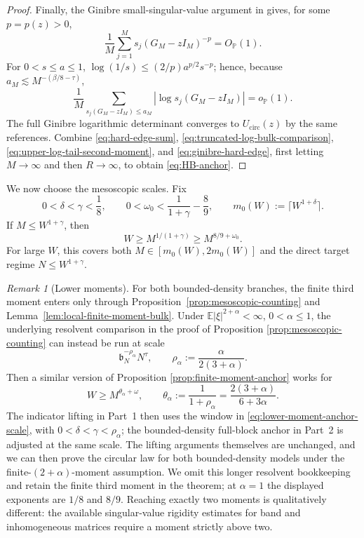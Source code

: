 \documentclass[11pt,reqno]{amsart}
\numberwithin{equation}{section}
\theoremstyle{definition}
\theoremstyle{remark}
\newtheorem{remark}[theorem]{Remark}
\newcommand{\E}{\mathbb E}
\newcommand{\Pp}{\mathbb P}
\newcommand{\1}{\mathbf 1}
\newcommand{\cir}{\mathrm{circ}}
\begin{document}
\begin{proof}
Finally, the Ginibre small-singular-value argument in
\cite[(4.9), Corollary~4.10, and Lemmas~4.11--4.12]
{BordenaveChafai2012}
gives, for some $p=p(z)>0$,
\[
 \frac1M\sum_{j=1}^M s_j(G_M-zI_M)^{-p}=O_{\Pp}(1).
\]
For $0<s\le a\le1$,
$\log(1/s)\le(2/p)a^{p/2}s^{-p}$; hence, because
$a_M\lesssim M^{-(\beta/8-\tau)}$,
\begin{equation}\label{eq:ginibre-hard-edge}
 \frac1M\sum_{s_j(G_M-zI_M)\le a_M}
 |\log s_j(G_M-zI_M)|=o_{\Pp}(1).
\end{equation}
The full Ginibre logarithmic determinant converges to $U_{\cir}(z)$ by the
same references.  Combine \eqref{eq:hard-edge-sum},
\eqref{eq:truncated-log-bulk-comparison},
\eqref{eq:upper-log-tail-second-moment}, and
\eqref{eq:ginibre-hard-edge}, first letting $M\to\infty$ and then
$R\to\infty$, to obtain \eqref{eq:HB-anchor}.
\end{proof}
We now choose the mesoscopic scales.  Fix
\begin{equation}\label{eq:scale-choice}
 0<\delta<\gamma<\frac18,\qquad
 0<\omega_0<\frac1{1+\gamma}-\frac89,\qquad
 m_0(W):=\lceil W^{1+\delta}\rceil.
\end{equation}
If $M\le W^{1+\gamma}$, then
\begin{equation}\label{eq:mesoscopic-window-high-band}
 W\ge M^{1/(1+\gamma)}\ge M^{8/9+\omega_0}.
\end{equation}
For large $W$, this covers both $M\in[m_0(W),2m_0(W)]$ and the direct
target regime $N\le W^{1+\gamma}$.
\begin{remark}[Lower moments]\label{rem:third-moment}
For both bounded-density branches, the finite third moment enters only
through Proposition~\ref{prop:mesoscopic-counting} and
Lemma~\ref{lem:local-finite-moment-bulk}.  Under
$\E|\xi|^{2+\alpha}<\infty$, $0<\alpha\le1$, the underlying resolvent
comparison in the proof of Proposition \ref{prop:mesoscopic-counting} can instead be run at scale
\[
 \mathfrak b_N^{-\rho_\alpha}N^\tau,
 \qquad \rho_\alpha:=\frac{\alpha}{2(3+\alpha)}.
\]
Then a similar version of Proposition \ref{prop:finite-moment-anchor} works for
\begin{equation}\label{eq:lower-moment-anchor-scale}
 W\ge M^{\theta_\alpha+\omega},
 \qquad \theta_\alpha:=\frac1{1+\rho_\alpha}
 =\frac{2(3+\alpha)}{6+3\alpha}.
\end{equation}
The indicator lifting in Part~1 then uses the window in
\eqref{eq:lower-moment-anchor-scale}, with
$0<\delta<\gamma<\rho_\alpha$; the bounded-density
full-block anchor in Part~2 is adjusted at the same scale.  The lifting
arguments themselves are unchanged, and we can then prove the circular
law for both bounded-density models under the finite-$(2+\alpha)$-moment
assumption.  We omit this longer resolvent
bookkeeping and retain the finite third moment in the theorem; at
$\alpha=1$ the displayed exponents are $1/8$ and $8/9$.  Reaching exactly
two moments is qualitatively different: the available singular-value
rigidity estimates for band and inhomogeneous matrices require a moment
strictly above two.
\end{remark}
\end{document}

